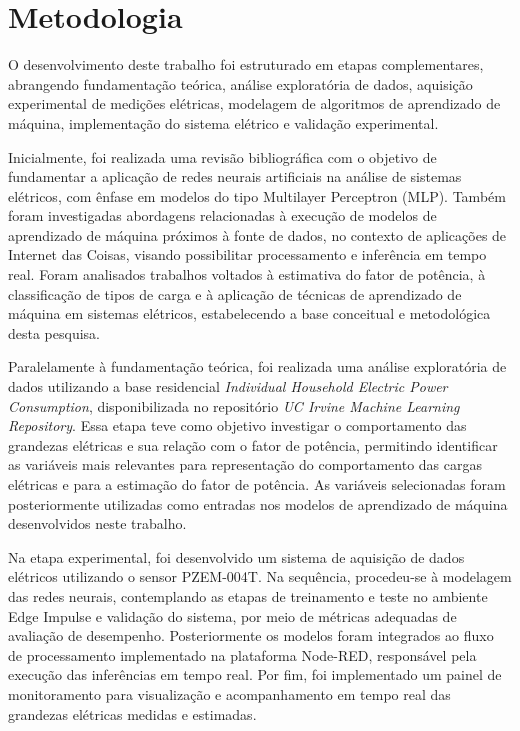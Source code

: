 
\chapter{Metodologia} \label{Metodologia}
O desenvolvimento deste trabalho foi estruturado em etapas complementares, abrangendo fundamentação teórica, análise exploratória de dados, aquisição experimental de medições elétricas, modelagem de algoritmos de aprendizado de máquina, implementação do sistema elétrico e validação experimental.

Inicialmente, foi realizada uma revisão bibliográfica com o objetivo de fundamentar a aplicação de redes neurais artificiais na análise de sistemas elétricos, com ênfase em modelos do tipo Multilayer Perceptron (MLP). Também foram investigadas abordagens relacionadas à execução de modelos de aprendizado de máquina próximos à fonte de dados, no contexto de aplicações de Internet das Coisas, visando possibilitar processamento e inferência em tempo real. Foram analisados trabalhos voltados à estimativa do fator de potência, à classificação de tipos de carga e à aplicação de técnicas de aprendizado de máquina em sistemas elétricos, estabelecendo a base conceitual e metodológica desta pesquisa.

Paralelamente à fundamentação teórica, foi realizada uma análise exploratória de dados utilizando a base residencial \textit{Individual Household Electric Power Consumption}, disponibilizada no repositório \textit{UC Irvine Machine Learning Repository}. Essa etapa teve como objetivo investigar o comportamento das grandezas elétricas e sua relação com o fator de potência, permitindo identificar as variáveis mais relevantes para representação do comportamento das cargas elétricas e para a estimação do fator de potência. As variáveis selecionadas foram posteriormente utilizadas como entradas nos modelos de aprendizado de máquina desenvolvidos neste trabalho.

Na etapa experimental, foi desenvolvido um sistema de aquisição de dados elétricos utilizando o sensor PZEM-004T. Na sequência, procedeu-se à modelagem das redes neurais, contemplando as etapas de treinamento e teste no ambiente Edge Impulse e validação do sistema, por meio de métricas adequadas de avaliação de desempenho. Posteriormente os modelos foram integrados ao fluxo de processamento implementado na plataforma Node-RED, responsável pela execução das inferências em tempo real. Por fim, foi implementado um painel de monitoramento para visualização e acompanhamento em tempo real das grandezas elétricas medidas e estimadas.

